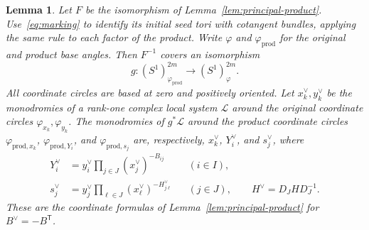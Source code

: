 \documentclass[12pt, letter]{amsart}
\newtheorem{lemma}[theorem]{Lemma}
\theoremstyle{definition}
\numberwithin{equation}{section}
\begin{document}
\begin{lemma}\label{lem:dual-product}
Let $F$ be the isomorphism of Lemma~\ref{lem:principal-product}.
Use~\eqref{eq:marking} to identify its initial seed tori with cotangent bundles,
applying the same rule to each factor of the product.
Write $\varphi$ and $\varphi_{\mathrm{prod}}$ for the original and product base angles.
Then $F^{-1}$ covers an isomorphism
\[
 g:(S^1)^{2m}_{\varphi_{\mathrm{prod}}}
       \longrightarrow (S^1)^{2m}_{\varphi}.
\]
All coordinate circles are based at zero and positively oriented.
Let $x_k^\vee,y_k^\vee$ be the monodromies of a rank-one complex local system
$\mathcal L$ around the original coordinate circles
$\varphi_{x_k},\varphi_{y_k}$.
The monodromies of $g^*\mathcal L$ around the product coordinate circles
$\varphi_{\mathrm{prod},x_k}$, $\varphi_{\mathrm{prod},Y_i}$,
and $\varphi_{\mathrm{prod},s_j}$ are, respectively,
$x_k^\vee$, $Y_i^\vee$, and $s_j^\vee$, where
\begin{equation}\label{eq:dual-product-coordinates}
 \begin{aligned}
 Y_i^\vee&=y_i^\vee\prod_{j\in J}(x_j^\vee)^{-B_{ij}}
                   &&(i\in I),\\
 s_j^\vee&=y_j^\vee\prod_{\ell\in J}(x_\ell^\vee)^{-H^\vee_{j\ell}}
                   &&(j\in J),\qquad H^\vee=D_JHD_J^{-1}.
 \end{aligned}
\end{equation}
These are the coordinate formulas of Lemma~\ref{lem:principal-product}
for $B^\vee=-B^{\mathsf T}$.
\end{lemma}
\end{document}
